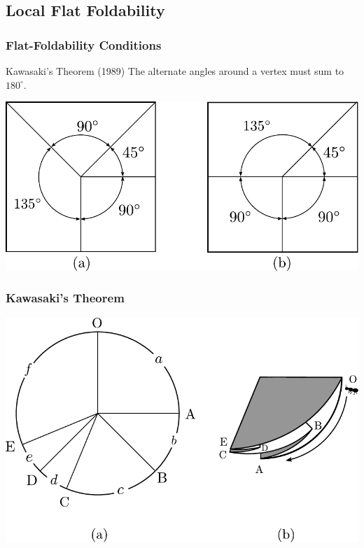\documentclass{beamer}
\begin{document}
\subsection{Local Flat Foldability}

\begin{frame}
\frametitle{Flat-Foldability Conditions}
\begin{block}{Kawasaki's Theorem (1989)}
The alternate angles around a vertex must sum to $180^\circ$.
\end{block}
\includegraphics[width=\textwidth]{foldability_pix/kawasaki_passfail.pdf}
\end{frame}
\begin{frame}
\frametitle{Kawasaki's Theorem}
\includegraphics[width=\textwidth]{foldability_pix/kawasaki_proof.pdf}
\end{frame}
\end{document}
